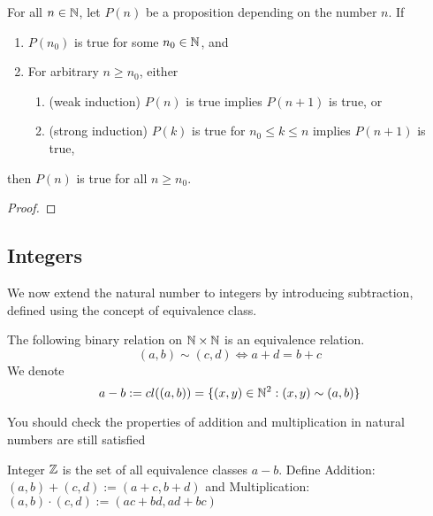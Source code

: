 \documentclass[11pt]{article}
\begin{document}
\begin{proposition}
  For all \(n \in \mathbb{N}\), let \(P(n)\) be a proposition depending on the number \(n\). If 
  \begin{enumerate}
    \item \(P(n_0)\) is true for some \(n_0 \in \mathbb{N}\), and
    \item For arbitrary \(n \geq n_0\), either
    \begin{enumerate}[label*=\arabic*.]
      \item (weak induction) \(P(n)\) is true implies \(P(n+1)\) is true, or
      \item (strong induction) \(P(k)\) is true for \(n_0 \leq k \leq n\) implies \(P(n+1)\) is true,
    \end{enumerate}
  \end{enumerate}
  then \(P(n)\) is true for all \(n \geq n_0\).
\end{proposition}
\begin{proof}
\end{proof}

\subsection{Integers}

We now extend the natural number to integers by introducing subtraction, defined using the concept of equivalence class.

\begin{proposition}[Subtraction]
  The following binary relation on \(\mathbb{N} \times \mathbb{N}\) is an equivalence relation.
  \begin{equation*}
    (a,b) \sim (c,d) \iff a+d=b+c
  \end{equation*}
  We denote 
  \begin{equation*}
    a-b := cl((a,b)) = \{(x,y)\in \mathbb{N}^2 : (x,y) \sim (a,b)\}
  \end{equation*}
\end{proposition}

You should check the properties of addition and multiplication in natural numbers are still satisfied

\begin{definition}[Integer]
  Integer \(\mathbb{Z}\) is the set of all equivalence classes \(a-b\).
  Define Addition: \((a,b)+(c,d) := (a+c,b+d)\) and Multiplication: \((a,b) \cdot (c,d) := (ac+bd, ad+bc)\)
\end{definition} %
\end{document}
